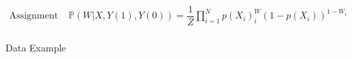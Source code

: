 \begin{align}
    \text{Assignment Mechanism:}\,&\mathbb{P}(W|X,Y(1),Y(0))=\dfrac{1}{Z}\prod_{i=1}^N p(X_i)^W_i(1-p(X_i))^{1-W_i}\\
\end{align}






    
    
    
    


    


    \begin{point}
        Data Example
    \end{point}
    
